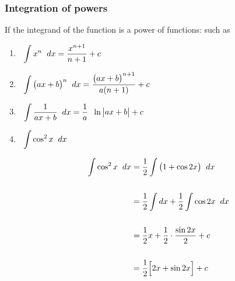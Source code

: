 \documentclass[11pt,a4paper]{article}
\begin{document}
\subsubsection{Integration of powers}
If the integrand of the function is a power of functions: such as 
\begin{enumerate}
\item $\hspace{0.2cm} \displaystyle{\int x^n\hspace{0.2cm} dx  = \dfrac{x^{n + 1}}{n + 1} + c}$\\

\item $\hspace{0.2cm}\displaystyle{\int \big(ax + b\big)^n  \hspace{0.2cm}dx = \dfrac{\big(ax + b\big)^{n +1}}{a(n+ 1)} + c}$\\

\item $\hspace{0.2cm}\displaystyle{\int \dfrac{1}{ax + b}\hspace{0.2cm}dx = \dfrac{1}{a}\hspace{0.2cm}\ln\begin{vmatrix}
ax + b\\
\end{vmatrix} + c}$\\

\item $\hspace{0.2cm}\displaystyle{\int \cos^2x\hspace{0.2cm}dx}$


\begin{align*}
\int \cos^2x\hspace{0.2cm}dx & = \dfrac{1}{2}\int \big(1 + \cos 2x\big)\hspace{0.2cm}dx\\\\
& = \dfrac{1}{2}\int dx + \dfrac{1}{2}\int \cos 2x\hspace{0.2cm}dx\\\\
&  = \dfrac{1}{2}x  + \dfrac{1}{2}\cdot \dfrac{\sin 2x}{2} + c\\\\
& = \dfrac{1}{2}\Big[2x + \sin 2x\Big] + c\\\\
\end{align*}
\end{enumerate}
\end{document}
